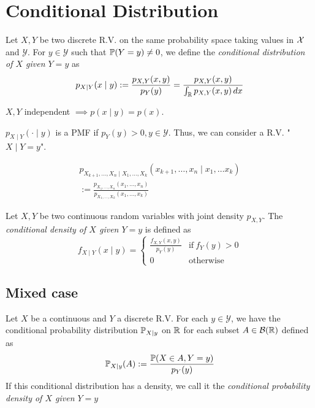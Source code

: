 \section{Conditional Distribution}
\begin{ddefinition*}
  Let \(X, Y\) be two discrete R.V. on the same probability space taking values in \(\DX\) and \(\mathcal{Y}\). For \(y \in \mathcal{Y}\) such that \(\P(Y = y) \neq 0\), we define the \textit{conditional distribution of \(X\) given \(Y = y\)} as
  \[p_{X \mid Y}(x \mid y) := \frac{p_{X, Y}(x, y)}{p_Y(y)} = \frac{p_{X, Y}(x, y)}{\int_\R p_{X, Y}(x, y) \,dx}\]
\end{ddefinition*}

\begin{proposition}
  \(X, Y\) independent \(\implies p(x \mid y) = p(x)\).
\end{proposition}

\begin{proposition}
  \(p_{X \mid Y}(\cdot \mid y)\) is a PMF if \(p_Y(y) > 0, y \in \mathcal{Y}\).
  Thus, we can consider a R.V. "\(X \mid Y = y\)".
\end{proposition}

\begin{dtheorem*} \vspace{-10pt}
  \begin{multline*}
    p_{X_{k+1}, \ldots, X_n \mid X_1, \ldots, X_k}(x_{k+1}, \ldots, x_n \mid x_1, \ldots x_k) \\
    := \frac{p_{X_1, \ldots, X_n}(x_1, \ldots, x_n)}{p_{X_1, \ldots, X_k}(x_1, \ldots, x_k)}
  \end{multline*}
\end{dtheorem*}

\begin{cdefinition*}
  Let \(X, Y\) be two continuous random variables with joint density \(p_{X, Y}\). The \textit{conditional density of \(X\) given \(Y = y\)} is defined as
  \[f_{X \mid Y}(x \mid y) = \begin{cases}
    \frac{f_{X, Y}(x, y)}{p_Y(y)} & \text{if} \ f_Y(y) > 0 \\
    0 & \text{otherwise}
  \end{cases}\]
\end{cdefinition*}

\subsection{Mixed case}
\begin{definition*}
  Let \(X\) be a continuous and \(Y\) a discrete R.V. For each \(y \in \mathcal{Y}\), we have the conditional probability distribution \(\P_{X \mid y}\) on \(\R\) for each subset \(A \in \B(\R)\) defined as
  \[\P_{X \mid y}(A) := \frac{\P(X \in A, Y = y)}{p_Y(y)}\]
  If this conditional distribution has a density, we call it the \textit{conditional probability density of \(X\) given \(Y = y\)}
\end{definition*}


